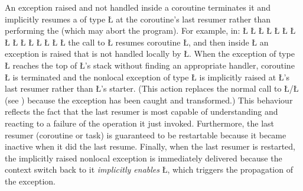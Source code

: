 \documentclass[openright,twoside]{report}
\begin{document}
An exception raised and not handled inside a coroutine terminates it and implicitly resumes a  of type \LGinlinetrue\LGbegin\lgrinde\L{}\endlgrinde\LGend{} at the coroutine's last resumer rather than performing the  (which may abort the program).
For example, in:
\LGinlinefalse\LGbegin\lgrinde
\L{}
\L{\LB{}}
\L{}
\L{\LB{}}
\L{}
\L{\LB{}}
\L{\LB{\};}}
\L{}
\L{\LB{}}
\L{\LB{}}
\L{\LB{}}
\L{\LB{}}
\L{\LB{}}
\L{\LB{}}
\L{\LB{\}}}
\endlgrinde\LGend
the call to \LGinlinetrue\LGbegin\lgrinde\L{}\endlgrinde\LGend{} resumes coroutine \LGinlinetrue\LGbegin\lgrinde\L{}\endlgrinde\LGend{}, and then inside \LGinlinetrue\LGbegin\lgrinde\L{}\endlgrinde\LGend{} an exception is raised that is not handled locally by \LGinlinetrue\LGbegin\lgrinde\L{}\endlgrinde\LGend{}.
When the exception of type \LGinlinetrue\LGbegin\lgrinde\L{}\endlgrinde\LGend{} reaches the top of \LGinlinetrue\LGbegin\lgrinde\L{}\endlgrinde\LGend{}'s stack without finding an appropriate handler, coroutine \LGinlinetrue\LGbegin\lgrinde\L{}\endlgrinde\LGend{} is terminated and the nonlocal exception of type \LGinlinetrue\LGbegin\lgrinde\L{}\endlgrinde\LGend{} is implicitly raised at \LGinlinetrue\LGbegin\lgrinde\L{}\endlgrinde\LGend{}'s last resumer rather than \LGinlinetrue\LGbegin\lgrinde\L{}\endlgrinde\LGend{}'s starter.
(This action replaces the normal call to \LGinlinetrue\LGbegin\lgrinde\L{}\endlgrinde\LGend{}/\LGinlinetrue\LGbegin\lgrinde\L{}\endlgrinde\LGend{} (see ) because the exception has been caught and transformed.)
This behaviour reflects the fact that the last resumer is most capable of understanding and reacting to a failure of the operation it just invoked.
Furthermore, the last resumer (coroutine or task) is guaranteed to be restartable because it became inactive when it did the last resume.
Finally, when the last resumer is restarted, the implicitly raised nonlocal exception is immediately delivered because the context switch back to it \emph{implicitly enables} \LGinlinetrue\LGbegin\lgrinde\L{}\endlgrinde\LGend{}, which triggers the propagation of the exception.
\end{document}
